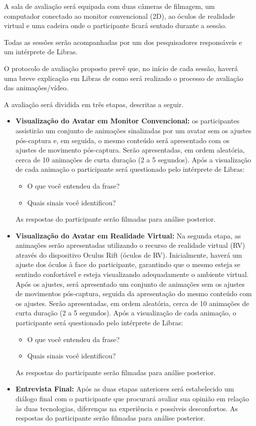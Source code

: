 \documentclass[a4paper,11pt,titlepage,singlespacing]{article}
\begin{document}
A sala de avaliação será equipada com duas câmeras de filmagem, um computador conectado ao monitor convencional (2D), ao óculos de realidade virtual e uma cadeira onde o participante ficará sentado durante a sessão.

Todas as sessões serão acompanhadas por um dos pesquisadores responsáveis e um intérprete de Libras.

O protocolo de avaliação proposto prevê que, no início de cada sessão, haverá uma breve explicação em Libras de como será realizado o processo de avaliação das animações/vídeo.

A avaliação será dividida em três etapas, descritas a seguir.

\begin{itemize}
\item \textbf{Visualização do Avatar em Monitor Convencional:} os participantes assistirão um conjunto de animações sinalizadas por um avatar sem os ajustes pós-captura e, em seguida, o mesmo conteúdo será apresentado com os ajustes de movimento pós-captura. Serão apresentadas, em ordem aleatória, cerca de 10 animações de curta duração (2 a 5 segundos). Após a visualização de cada animação o participante será questionado pelo intérprete de Libras:
\begin{itemize}
\item O que você entendeu da frase?
\item Quais sinais você identificou?
\end{itemize}
As respostas do participante serão filmadas para análise posterior.

\item \textbf{Visualização do Avatar em Realidade Virtual:} 
Na segunda etapa, as animações serão apresentadas utilizando o recurso de realidade virtual (RV) através do dispositivo Oculus Rift (óculos de RV). 
Inicialmente, haverá um ajuste dos óculos à face do participante, garantindo que o mesmo esteja se sentindo confortável e esteja visualizando adequadamente o ambiente virtual. Após os ajustes, será apresentado um conjunto de animações sem os ajustes de movimentos pós-captura, seguida da apresentação do mesmo conteúdo com os ajustes. Serão apresentadas, em ordem aleatória, cerca de 10 animações de curta duração (2 a 5 segundos).
Após a visualização de cada animação, o participante será questionado pelo intérprete de Libras:
\begin{itemize}
\item O que você entendeu da frase?
\item Quais sinais você identificou?
\end{itemize}
As respostas do participante serão filmadas para análise posterior.

\item \textbf{Entrevista Final:} Após as duas etapas anteriores será estabelecido um diálogo final com o participante que procurará avaliar sua opinião em relação às duas tecnologias, diferenças na experiência e possíveis desconfortos. As respostas do participante serão filmadas para análise posterior.

\end{itemize}
\end{document}
